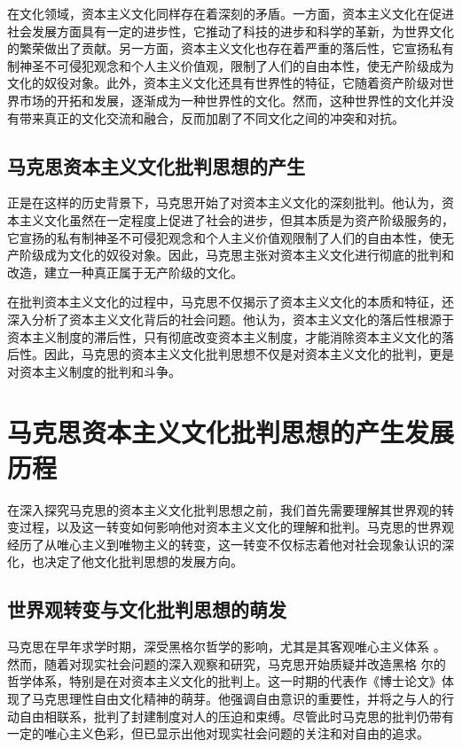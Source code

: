 在文化领域，资本主义文化同样存在着深刻的矛盾。一方面，资本主义文化在促进社会发展方面具有一定的进步性，它推动了科技的进步和科学的革新，为世界文化的繁荣做出了贡献。另一方面，资本主义文化也存在着严重的落后性，它宣扬私有制神圣不可侵犯观念和个人主义价值观，限制了人们的自由本性，使无产阶级成为文化的奴役对象。此外，资本主义文化还具有世界性的特征，它随着资产阶级对世界市场的开拓和发展，逐渐成为一种世界性的文化。然而，这种世界性的文化并没有带来真正的文化交流和融合，反而加剧了不同文化之间的冲突和对抗。
\subsection{马克思资本主义文化批判思想的产生}


正是在这样的历史背景下，马克思开始了对资本主义文化的深刻批判。他认为，资本主义文化虽然在一定程度上促进了社会的进步，但其本质是为资产阶级服务的，它宣扬的私有制神圣不可侵犯观念和个人主义价值观限制了人们的自由本性，使无产阶级成为文化的奴役对象。因此，马克思主张对资本主义文化进行彻底的批判和改造，建立一种真正属于无产阶级的文化。

在批判资本主义文化的过程中，马克思不仅揭示了资本主义文化的本质和特征，还深入分析了资本主义文化背后的社会问题。他认为，资本主义文化的落后性根源于资本主义制度的滞后性，只有彻底改变资本主义制度，才能消除资本主义文化的落后性。因此，马克思的资本主义文化批判思想不仅是对资本主义文化的批判，更是对资本主义制度的批判和斗争。

\newpage
\section{马克思资本主义文化批判思想的产生发展历程}
在深入探究马克思的资本主义文化批判思想之前，我们首先需要理解其世界观的转变过程，以及这一转变如何影响他对资本主义文化的理解和批判。马克思的世界观经历了从唯心主义到唯物主义的转变，这一转变不仅标志着他对社会现象认识的深化，也决定了他文化批判思想的发展方向。
\subsection{世界观转变与文化批判思想的萌发}
马克思在早年求学时期，深受黑格尔哲学的影响，尤其是其客观唯心主义体系
。然而，随着对现实社会问题的深入观察和研究，马克思开始质疑并改造黑格
尔的哲学体系，特别是在对资本主义文化的批判上。这一时期的代表作《博士论文》体现了马克思理性自由文化精神的萌芽。他强调自由意识的重要性，并将之与人的行动自由相联系，批判了封建制度对人的压迫和束缚。尽管此时马克思的批判仍带有一定的唯心主义色彩，但已显示出他对现实社会问题的关注和对自由的追求。


